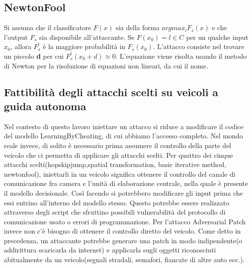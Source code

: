 \subsection{NewtonFool}
\cite{newton}
Si assuma che  il classificatore $F(x)$ sia della forma $arg max_l F_s(x)$ e che l'output $F_s$ sia disponibile all'attaccante. Se $F(x_0) = l \in C$ per un qualche  input $x_0$, allora $F^l_s$ è la maggiore probabilità
in $F_s(x_0)$. L'attacco consiste nel trovare un piccolo \textbf{d} per cui $F^l_s(x_0 + d) \approx 0$. L'equazione viene risolta usando il metodo di Newton
per la risoluzione di equazioni non lineari, da cui il nome.

\subsection{Fattibilità degli attacchi scelti su veicoli a guida autonoma}
Nel contesto di questo lavoro iniettare un attacco si riduce a modificare il codice del modello LearningByCheating, di cui abbiamo l'accesso completo. Nel  mondo reale invece, di solito è necessario prima assumere il controllo della parte del  veicolo che ci permetta di applicare gli attacchi scelti.
Per quattro dei cinque attacchi scelti(hopskipjump,spatial transformation, basic iterative method, newtonfool), iniettarli in un veicolo significa ottenere il controllo del canale
di comunicazione fra camera e l'unità di elaborazione centrale, nella quale è presente il modello decisionale. Così facendo si potrebbero  modificare gli input prima che essi entrino
all'interno del modello stesso. Questo potrebbe essere realizzato attraverso degli script che sfruttino possibili vulnerabilità del protocollo di comunicazione usato o errori di programmazione.
Per l'attacco Adversarial Patch invece non c'è bisogno  di ottenere il controllo diretto del veicolo. Come detto in precedenza, un attaccante potrebbe generare
una patch in modo indipendente(o addirittura scaricarla da internet) e applicarla sugli oggetti riconosciuti abitualmente da un veicolo(segnali stradali, semafori, fiancate di altre auto ecc.).